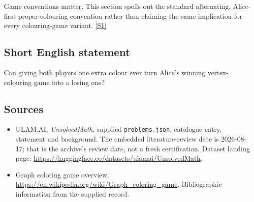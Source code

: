 \documentclass[11pt,a4paper]{article}
\newcommand{\sref}[2]{\hyperlink{source:#1:#2}{[S#2]}}
\begin{document}
Game conventions matter. This section spells out the standard alternating, Alice-first proper-colouring convention rather than claiming the same implication for every colouring-game variant. \sref{statement}{1}

\subsection{Short English statement}

Can giving both players one extra colour ever turn Alice’s winning vertex-colouring game into a losing one?

\subsection{Sources}

{\small

\begin{itemize}

\item[\hypertarget{source:statement:1}{S1}] ULAM.AI, \emph{UnsolvedMath}, supplied \texttt{problems.json}, catalogue entry, statement and background. The embedded literature-review date is 2026-08-17; that is the archive’s review date, not a fresh certification. Dataset landing page: \url{https://huggingface.co/datasets/ulamai/UnsolvedMath}.

\item[\hypertarget{source:statement:2}{S2}] Graph coloring game overview. \url{https://en.wikipedia.org/wiki/Graph_coloring_game}. Bibliographic information from the supplied record.

\end{itemize}

}

\label{end:statement}
\end{document}
